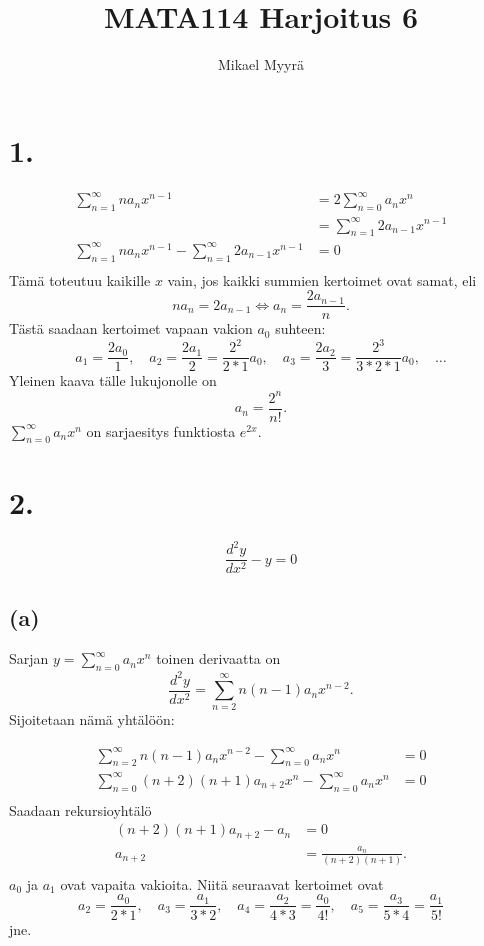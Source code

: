 \documentclass{article}
\title{MATA114 Harjoitus 6}
\author{Mikael Myyrä}
\date{}
\begin{document}
\maketitle

\section*{1.}

\begin{align*}
  \sum_{n=1}^{\infty} na_nx^{n-1} &= 2\sum_{n=0}^{\infty} a_nx^n \\
                                  &= \sum_{n=1}^{\infty} 2a_{n-1}x^{n-1} \\
  \sum_{n=1}^{\infty} na_nx^{n-1} - \sum_{n=1}^{\infty} 2a_{n-1}x^{n-1} &= 0 \\
\end{align*}
Tämä toteutuu kaikille $x$ vain, jos kaikki summien kertoimet ovat samat, eli
\[
  na_n = 2a_{n-1} \iff a_n = \frac{2a_{n-1}}{n}.
\]
Tästä saadaan kertoimet vapaan vakion $a_0$ suhteen:
\[
  a_1 = \frac{2a_0}{1},
  \quad a_2 = \frac{2a_1}{2} = \frac{2^2}{2 * 1}a_0,
  \quad a_3 = \frac{2a_2}{3} = \frac{2^3}{3 * 2 * 1}a_0,
  \quad \dots
\]
Yleinen kaava tälle lukujonolle on
\[
  a_n = \frac{2^n}{n!}.
\]
$\sum_{n=0}^{\infty}a_nx^n$ on sarjaesitys funktiosta $e^{2x}$.

\section*{2.}

\[
  \frac{d^2 y}{d x^2} - y = 0
\]

\subsection*{(a)}

Sarjan $y = \sum_{n=0}^{\infty} a_nx^n$ toinen derivaatta on
\[
  \frac{d^2 y}{d x^2} = \sum_{n=2}^{\infty} n(n-1)a_nx^{n-2}.
\]
Sijoitetaan nämä yhtälöön:

\begin{align*}
  \sum_{n=2}^{\infty} n(n-1)a_nx^{n-2} - \sum_{n=0}^{\infty} a_nx^n &= 0 \\
  \sum_{n=0}^{\infty}(n+2)(n+1)a_{n+2}x^n - \sum_{n=0}^{\infty} a_nx^n &= 0 \\
\end{align*}
Saadaan rekursioyhtälö
\begin{align*}
  (n+2)(n+1)a_{n+2} - a_n &= 0 \\
  a_{n+2} &= \frac{a_n}{(n+2)(n+1)}. \\
\end{align*}
$a_0$ ja $a_1$ ovat vapaita vakioita. Niitä seuraavat kertoimet ovat
\[
  a_2 = \frac{a_0}{2 * 1}, \quad
  a_3 = \frac{a_1}{3 * 2}, \quad
  a_4 = \frac{a_2}{4 * 3} = \frac{a_0}{4!}, \quad
  a_5 = \frac{a_3}{5 * 4} = \frac{a_1}{5!}
\]
jne.
\end{document}
